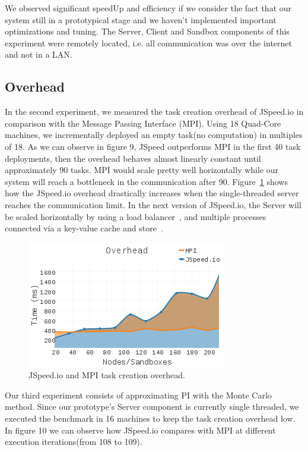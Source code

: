 \documentclass[10pt,reprint]{socc14}
\begin{document}
We observed significant speedUp and efficiency if we consider the fact that our system still in a prototypical stage and we haven’t implemented important optimizations and tuning. The Server, Client and Sandbox components of this experiment were remotely located, i.e. all communication was over the internet and not in a LAN.


\subsection{Overhead}

In the second experiment, we measured the task creation overhead of JSpeed.io in comparison with the Message Passing Interface (MPI). Using 18 Quad-Core machines, we incrementally deployed an empty task(no computation) in multiples of 18. As we can observe in figure 9, JSpeed outperforms MPI in the first 40 task deployments, then the overhead behaves almost linearly constant until approximately 90 tasks. MPI would scale pretty well horizontally while our system will reach a bottleneck in the communication after 90. Figure~\ref{fig:Overhead} shows how the JSpeed.io overhead drastically increases when the single-threaded server reaches the communication limit. In the next version of JSpeed.io, the Server will be scaled horizontally by using a load balancer~\cite{Nginx}, and multiple processes connected via a key-value cache and store~\cite{Redis}.

\begin{figure}	
	\centering
	\includegraphics[scale=3.0]{Overhead}
	\caption{JSpeed.io and MPI task creation overhead.}
	\label{fig:Overhead}
\end{figure}


Our third experiment consists of approximating PI with the Monte Carlo method. Since our prototype’s Server component is currently single threaded, we executed the benchmark in 16 machines to keep the task creation overhead low. In figure 10 we can observe how JSpeed.io compares with MPI at different execution iterations(from 108 to 109).
\end{document}
